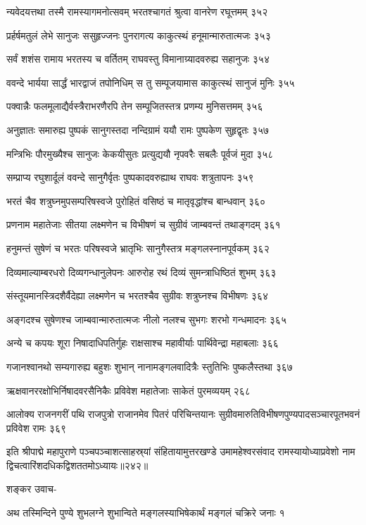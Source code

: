न्यवेदयत्तथा तस्मै रामस्यागमनोत्सवम्
भरतश्चागतं श्रुत्वा वानरेण रघूत्तमम् ३५२

प्रर्हर्षमतुलं लेभे सानुजः ससुहृज्जनः
पुनरागत्य काकुत्स्थं हनूमान्मारुतात्मजः ३५३

सर्वं शशंस रामाय भरतस्य च वर्तितम्
राघवस्तु विमानाग्र्यादवरुह्य सहानुजः ३५४

ववन्दे भार्यया सार्द्धं भारद्वाजं तपोनिधिम्
स तु सम्पूजयामास काकुत्स्थं सानुजं मुनिः ३५५

पक्वान्नैः फलमूलाद्यैर्वस्त्रैराभरणैरपि
तेन सम्पूजितस्तत्र प्रणम्य मुनिसत्तमम् ३५६

अनुज्ञातः समारुह्य पुष्पकं सानुगस्तदा
नन्दिग्रामं ययौ रामः पुष्पकेण सुहृद्वृतः ३५७

मन्त्रिभिः पौरमुख्यैश्च सानुजः केकयीसुतः
प्रत्युद्ययौ नृपवरैः सबलैः पूर्वजं मुदा ३५८

सम्प्राप्य रघुशार्दूलं ववन्दे सानुगैर्वृतः
पुष्पकादवरुह्याथ राघवः शत्रुतापनः ३५९

भरतं चैव शत्रुघ्नमुपसम्परिषस्वजे
पुरोहितं वसिष्ठं च मातृवृद्धांश्च बान्धवान् ३६०

प्रणनाम महातेजाः सीतया लक्ष्मणेन च
विभीषणं च सुग्रीवं जाम्बवन्तं तथाङ्गदम् ३६१

हनुमन्तं सुषेणं च भरतः परिषस्वजे
भ्रातृभिः सानुगैस्तत्र मङ्गलस्नानपूर्वकम् ३६२

दिव्यमाल्याम्बरधरो दिव्यगन्धानुलेपनः
आरुरोह रथं दिव्यं सुमन्त्राधिष्ठितं शुभम् ३६३

संस्तूयमानस्त्रिदशैर्वैदेह्या लक्ष्मणेन च
भरतश्चैव सुग्रीवः शत्रुघ्नश्च विभीषणः ३६४

अङ्गदश्च सुषेणश्च जाम्बवान्मारुतात्मजः
नीलो नलश्च सुभगः शरभो गन्धमादनः ३६५

अन्ये च कपयः शूरा निषादाधिपतिर्गुहः
राक्षसाश्च महावीर्याः पार्थिवेन्द्रा महाबलाः ३६६

गजानश्वानथो सम्यगारुह्य बहुशः शुभान्
नानामङ्गलवादित्रैः स्तुतिभिः पुष्कलैस्तथा ३६७

ऋक्षवानररक्षोभिर्निषादवरसैनिकैः
प्रविवेश महातेजाः साकेतं पुरमव्ययम् २६८

आलोक्य राजनगरीं पथि राजपुत्रो राजानमेव पितरं परिचिन्तयानः
सुग्रीवमारुतिविभीषणपुण्यपादसञ्चारपूतभवनं प्रविवेश रामः ३६९

इति श्रीपाद्मे महापुराणे पञ्चपञ्चाशत्साहस्र्यां संहितायामुत्तरखण्डे उमामहेश्वरसंवाद रामस्यायोध्याप्रवेशो नाम द्विचत्वारिंशदधिकद्विशततमोऽध्यायः॥२४२॥


शङ्कर उवाच-

अथ तस्मिन्दिने पुण्ये शुभलग्ने शुभान्विते
मङ्गलस्याभिषेकार्थं मङ्गलं चक्रिरे जनाः १

